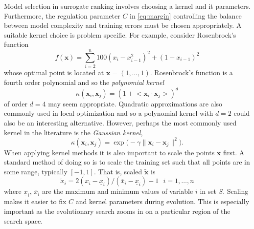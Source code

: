 \documentclass[10pt]{llncs}
\newcommand{\norm}[1]{\lVert#1\rVert}
\renewcommand{\vec}[1]{{\mbox{\boldmath$#1$}}}
\newcommand{\inner}[2]{\big<\vec{#1}\cdot\vec{#2}\big>}
\renewcommand{\vec}[1]{{\mathbf #1}}
\begin{document}
Model selection in surrogate ranking involves choosing a kernel
and it parameters. Furthermore, the regulation parameter $C$ in
\eqref{eq:margin} controlling the balance between model
complexity and training errors must be chosen appropriately.  A
suitable kernel choice is problem specific. For example,
consider Rosenbrock's function
\begin{equation}
f(\vec{x}) = \sum_{i=2}^n 100(x_{i}-x_{i-1}^2)^2 + (1-x_{i-1})^2
\end{equation}
whose optimal point is located at $\vec{x} = (1,\ldots,1)$.
Rosenbrock's function is a fourth order polynomial and so the
\emph{polynomial kernel}
\begin{equation}
\kappa(\vec{x}_i,\vec{x}_j) = (1 + \inner{x_i}{x_j})^d
\end{equation}
of order $d=4$ may seem appropriate. Quadratic approximations are
also commonly used in local optimization and so a polynomial kernel
with $d=2$ could also be an interesting alternative. However, perhaps the most 
commonly used kernel in the literature is the \emph{Gaussian kernel},
\begin{equation}
\kappa(\vec{x}_i,\vec{x}_j) = \exp\big(-\gamma \norm{\vec{x}_i-\vec{x}_j}^2\big).
\end{equation}
When applying kernel methods it is also important to scale the
points $\vec{x}$ first. A standard method of doing so is to
scale the training set such that all points are in some range,
typically $[-1,1]$. That is, scaled $\tilde{\vec{x}}$ is
\begin{equation}
\tilde x_i = 2 (x_i - \underline{x}_i) / (\overline{x}_i -
\underline{x}_i) - 1 ~~~ i = 1,\ldots,n
\end{equation}
where $\underline{x}_i$, $\overline{x}_i$ are the maximum and
minimum values of variable $i$ in set $S$. Scaling makes it
easier to fix $C$ and kernel parameters during evolution. This
is especially important as the evolutionary search zooms in on a
particular region of the search space.
\end{document}
